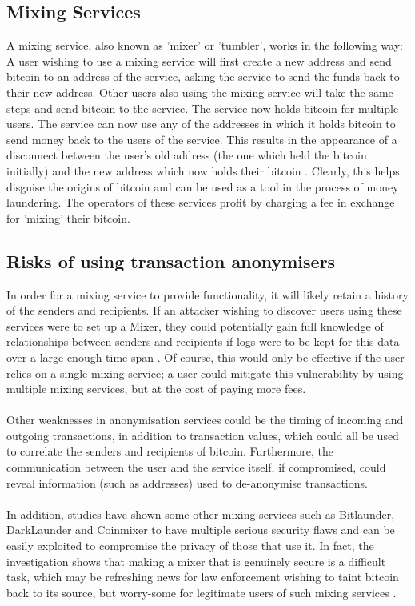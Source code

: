 \subsection{Mixing Services}\label{background-mixing-service}
A mixing service, also known as 'mixer' or 'tumbler', works in the following way: A user wishing to use a mixing service will first create a new address and send bitcoin to an address of the service, asking the service to send the funds back to their new address. Other users also using the mixing service will take the same steps and send bitcoin to the service. The service now holds bitcoin for multiple users. The service can now use any of the addresses in which it holds bitcoin to send money back to the users of the service. This results in the appearance of a disconnect between the user's old address (the one which held the bitcoin initially) and the new address which now holds their bitcoin \cite{RefWorks:doc:5c3dace5e4b0613d0cda512b}. Clearly, this helps disguise the origins of bitcoin and can be used as a tool in the process of money laundering. The operators of these services profit by charging a fee in exchange for 'mixing' their bitcoin. 

\subsection{Risks of using transaction anonymisers}
In order for a mixing service to provide functionality, it will likely retain a history of the senders and recipients. If an attacker wishing to discover users using these services were to set up a Mixer, they could potentially gain full knowledge of relationships between senders and recipients if logs were to be kept for this data over a large enough time span \cite{RefWorks:doc:5c3dace5e4b0613d0cda512b}. Of course, this would only be effective if the user relies on a single mixing service; a user could mitigate this vulnerability by using multiple mixing services, but at the cost of paying more fees. 
\\\\
Other weaknesses in anonymisation services could be the timing of incoming and outgoing transactions, in addition to transaction values, which could all be used to correlate the senders and recipients of bitcoin. Furthermore, the communication between the user and the service itself, if compromised, could reveal information (such as addresses) used to de-anonymise transactions. 
\\\\
In addition, studies have shown some other mixing services such as Bitlaunder, DarkLaunder and Coinmixer to have multiple serious security flaws and can be easily exploited to compromise the privacy of those that use it. In fact, the investigation shows that making a mixer that is genuinely secure is a difficult task, which may be refreshing news for law enforcement wishing to taint bitcoin back to its source, but worry-some for legitimate users of such mixing services \cite{RefWorks:doc:5c3db214e4b0854ae6124c26}. 



